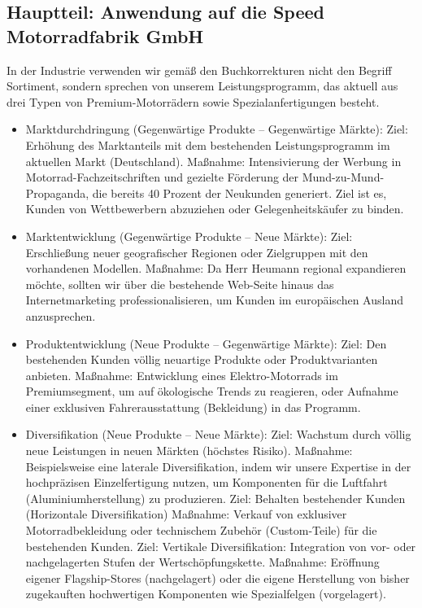 \documentclass[12pt, a4paper]{article}
\begin{document}
\subsection{Hauptteil: Anwendung auf die Speed Motorradfabrik GmbH}
In der Industrie verwenden wir gemäß den Buchkorrekturen nicht den Begriff Sortiment, sondern sprechen von unserem Leistungsprogramm, das aktuell aus drei Typen von Premium-Motorrädern sowie Spezialanfertigungen besteht.
\begin{itemize}
\item Marktdurchdringung (Gegenwärtige Produkte – Gegenwärtige Märkte): \newline
    Ziel: Erhöhung des Marktanteils mit dem bestehenden Leistungsprogramm im aktuellen Markt (Deutschland). \newline
    Maßnahme: Intensivierung der Werbung in Motorrad-Fachzeitschriften und gezielte 
    Förderung der Mund-zu-Mund-Propaganda, die bereits 40 Prozent der Neukunden generiert. 
    Ziel ist es, Kunden von Wettbewerbern abzuziehen oder Gelegenheitskäufer zu binden.
\item Marktentwicklung (Gegenwärtige Produkte – Neue Märkte):
    Ziel: Erschließung neuer geografischer Regionen oder Zielgruppen mit den vorhandenen Modellen.
    Maßnahme: Da Herr Heumann regional expandieren möchte, sollten wir über die bestehende Web-Seite hinaus das Internetmarketing professionalisieren, um Kunden im europäischen Ausland anzusprechen.
\item Produktentwicklung (Neue Produkte – Gegenwärtige Märkte): \newline
    Ziel: Den bestehenden Kunden völlig neuartige Produkte oder Produktvarianten anbieten. \newline
    Maßnahme: Entwicklung eines Elektro-Motorrads im Premiumsegment, um auf ökologische 
    Trends zu reagieren, oder Aufnahme einer exklusiven Fahrerausstattung (Bekleidung) in das Programm.
\item Diversifikation (Neue Produkte – Neue Märkte): \newline
    Ziel: Wachstum durch völlig neue Leistungen in neuen Märkten (höchstes Risiko).\newline
    Maßnahme: Beispielsweise eine laterale Diversifikation, indem wir unsere Expertise 
    in der hochpräzisen Einzelfertigung nutzen, um Komponenten für die Luftfahrt (Aluminiumherstellung) zu produzieren.
    Ziel: Behalten bestehender Kunden (Horizontale Diversifikation)
    Maßnahme: Verkauf von exklusiver Motorradbekleidung oder technischem Zubehör (Custom-Teile) für die bestehenden Kunden.
    Ziel: Vertikale Diversifikation: Integration von vor- oder nachgelagerten Stufen der Wertschöpfungskette.
    Maßnahme: Eröffnung eigener Flagship-Stores (nachgelagert) oder die eigene Herstellung von bisher zugekauften hochwertigen Komponenten wie Spezialfelgen (vorgelagert).
\end{itemize}
\end{document}
